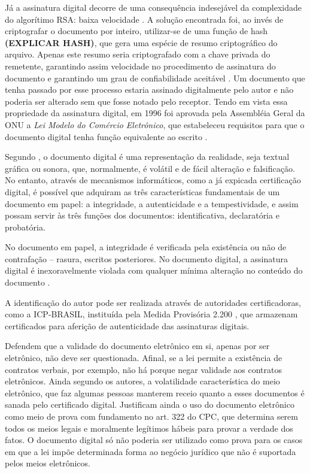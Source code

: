   Já a assinatura digital decorre de uma consequência indesejável
  da complexidade do algorítimo RSA: baixa velocidade
  \cite{ComputerNetworks}. A solução encontrada foi, ao invés de
  criptografar o documento por inteiro, utilizar-se de uma função
  de hash \textbf{(EXPLICAR HASH)}, que gera uma espécie de
  resumo criptográfico do arquivo. Apenas este resumo seria
  criptografado com a chave privada do remetente, garantindo
  assim velocidade no procedimento de assinatura do documento e
  garantindo um grau de confiabilidade
  aceitável \cite{ComputerNetworks}. Um documento que tenha
  passado por esse processo estaria assinado digitalmente pelo
  autor e não poderia ser alterado sem que fosse notado pelo
  receptor. Tendo em vista essa propriedade da assinatura
  digital, em 1996 foi aprovada pela Assembléia Geral da ONU a
  \emph{Lei Modelo do Comércio
  Eletrônico}, que estabeleceu requisitos para que o documento
  digital tenha função equivalente ao escrito
  .

	Segundo , o documento digital é
  uma representação da realidade, seja textual gráfica ou sonora,
  que, normalmente, é volátil e de fácil alteração e
  falsificação. No entanto, através de mecanismos informáticos,
  como a já expicada certificação digital, é possível que
  adquiram as três características fundamentais de um documento
  em papel: a integridade, a autenticidade e a tempestividade, e
  assim possam servir às três funções dos documentos:
  identificativa, declaratória e probatória. \par
	
	No documento em papel, a integridade é verificada pela
  existência ou não de contrafação – rasura, escritos
  posteriores. No documento digital, a assinatura digital é
  inexoravelmente violada com qualquer mínima alteração no
  conteúdo do documento \cite{CertificadoDigital}.\par
	
	A identificação do autor pode ser realizada através de
  autoridades certificadoras, como a ICP-BRASIL, instituída pela
  Medida Provisória 2.200 \cite{MedProv2200}, que armazenam certificados para
  aferição de autenticidade das assinaturas digitais. \par
	
	Defendem  que a validade do
  documento eletrônico em si, apenas por ser eletrônico, não deve
  ser questionada.  Afinal, se a lei permite a existência de
  contratos verbais, por exemplo, não há porque negar validade
  aos contratos eletrônicos. Ainda segundo os autores, a
  volatilidade característica do meio eletrônico, que faz algumas
  pessoas manterem receio quanto a esses documentos é sanada pelo
  certificado digital. Justificam ainda o uso do documento
  eletrônico como meio de prova com fundamento no art. 322 do
  CPC, que determina serem todos os meios legais e moralmente
  legítimos hábeis para provar a verdade dos fatos. O documento
  digital só não poderia ser utilizado como prova para os casos
  em que a lei impõe determinada forma ao negócio jurídico que
  não é suportada pelos meios eletrônicos. \par
	
